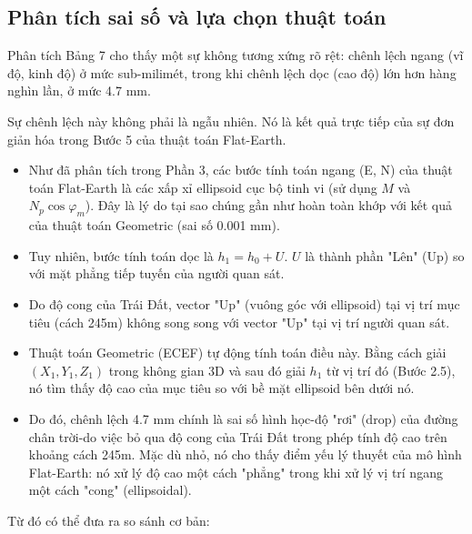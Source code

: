 \subsection{Phân tích sai số và lựa chọn thuật toán}
Phân tích Bảng 7 cho thấy một sự không tương xứng rõ rệt: chênh lệch ngang (vĩ độ, kinh độ) ở mức sub-milimét, trong khi chênh lệch dọc (cao độ) lớn hơn hàng nghìn lần, ở mức 4.7 mm.

Sự chênh lệch này không phải là ngẫu nhiên. Nó là kết quả trực tiếp của sự đơn giản hóa trong Bước 5 của thuật toán Flat-Earth.
\begin{itemize}
    \item Như đã phân tích trong Phần 3, các bước tính toán ngang (E, N) của thuật toán Flat-Earth là các xấp xỉ ellipsoid cục bộ tinh vi (sử dụng $M$ và $N_p \cos \varphi_m$). Đây là lý do tại sao chúng gần như hoàn toàn khớp với kết quả của thuật toán Geometric (sai số 0.001 mm).
    \item Tuy nhiên, bước tính toán dọc là $h_1 = h_0 + U$. $U$ là thành phần "Lên" (Up) so với mặt phẳng tiếp tuyến của người quan sát.
    \item Do độ cong của Trái Đất, vector "Up" (vuông góc với ellipsoid) tại vị trí mục tiêu (cách 245m) không song song với vector "Up" tại vị trí người quan sát.
    \item Thuật toán Geometric (ECEF) tự động tính toán điều này. Bằng cách giải $(X_1, Y_1, Z_1)$ trong không gian 3D và sau đó giải $h_1$ từ vị trí đó (Bước 2.5), nó tìm thấy độ cao của mục tiêu so với bề mặt ellipsoid bên dưới nó.
    \item Do đó, chênh lệch 4.7 mm chính là sai số hình học-độ "rơi" (drop) của đường chân trời-do việc bỏ qua độ cong của Trái Đất trong phép tính độ cao trên khoảng cách 245m. Mặc dù nhỏ, nó cho thấy điểm yếu lý thuyết của mô hình Flat-Earth: nó xử lý độ cao một cách "phẳng" trong khi xử lý vị trí ngang một cách "cong" (ellipsoidal).
\end{itemize}

Từ đó có thể đưa ra so sánh cơ bản:

